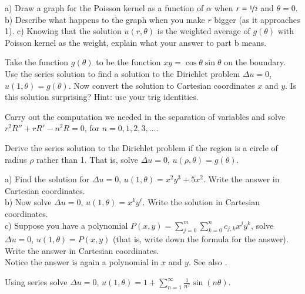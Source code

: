 \documentclass[12pt]{book}
\begin{document}
\begin{exercise}
a) Draw a graph for the Poisson kernel as a function of $\alpha$
when $r=\nicefrac{1}{2}$ and $\theta = 0$.
b) Describe what happens to the graph when you make $r$ bigger (as it
approaches 1).
c) Knowing that the solution $u(r,\theta)$ is the weighted average
of $g(\theta)$ with Poisson kernel as the weight, explain what your answer
to part b means.
\end{exercise}

\begin{exercise} \label{exercise:dirichproblemxy}
Take the function $g(\theta)$ to be the function $xy = \cos \theta \sin
\theta$ on the boundary.  Use the series solution to find a solution
to the Dirichlet problem $\Delta u = 0$, $u(1,\theta) = g(\theta)$.  Now
convert the solution to Cartesian coordinates $x$ and $y$.  Is this
solution surprising?  Hint: use your trig identities.
\end{exercise}

\begin{exercise}
Carry out the computation we needed in the separation of variables and solve
$r^2 R'' + r R' - n^2 R = 0$, for $n=0,1,2,3,\ldots$.
\end{exercise}

\begin{exercise}[challenging]
Derive the series solution to the Dirichlet problem if the region is a
circle of radius $\rho$ rather
than 1.
That is, solve $\Delta u = 0$, $u(\rho,\theta) = g(\theta)$.
\end{exercise}

\begin{exercise}[challenging]
a) Find the solution for
$\Delta u = 0$, $u(1,\theta) = x^2y^3 + 5 x^2$.  Write the answer in Cartesian coordinates.
\\
b) Now solve
$\Delta u = 0$, $u(1,\theta) = x^k y^\ell$.
Write the solution in Cartesian coordinates.
\\
c) Suppose you have a polynomial $P(x,y) = \sum_{j=0}^m \sum_{k=0}^n c_{j,k}
x^j y^k$, solve $\Delta u = 0$, $u(1,\theta) = P(x,y)$ (that is, write down
the formula for the answer).  Write the answer
in Cartesian coordinates.\\
Notice the answer is again a polynomial in $x$ and $y$.
See also .
\end{exercise}

\setcounter{exercise}{100}

\begin{exercise}
Using series solve
$\Delta u = 0$, $u(1,\theta) = 1+ \sum\limits_{n=1}^\infty \frac{1}{n^2}\sin(n\theta)$.
\end{exercise}
\end{document}
